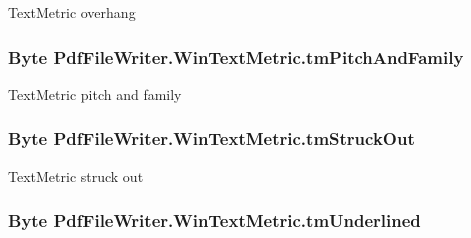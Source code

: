 Text\+Metric overhang 

\subsubsection[{\texorpdfstring{tm\+Pitch\+And\+Family}{tmPitchAndFamily}}]{\setlength{\rightskip}{0pt plus 5cm}Byte Pdf\+File\+Writer.\+Win\+Text\+Metric.\+tm\+Pitch\+And\+Family\hspace{0.3cm}{\ttfamily [get]}}\hypertarget{class_pdf_file_writer_1_1_win_text_metric_ad557d75a4c414b8531c2b94af735dd3f}{}\label{class_pdf_file_writer_1_1_win_text_metric_ad557d75a4c414b8531c2b94af735dd3f}


Text\+Metric pitch and family 

\subsubsection[{\texorpdfstring{tm\+Struck\+Out}{tmStruckOut}}]{\setlength{\rightskip}{0pt plus 5cm}Byte Pdf\+File\+Writer.\+Win\+Text\+Metric.\+tm\+Struck\+Out\hspace{0.3cm}{\ttfamily [get]}}\hypertarget{class_pdf_file_writer_1_1_win_text_metric_a97c902bffde99c2cec601f3a263bb1e0}{}\label{class_pdf_file_writer_1_1_win_text_metric_a97c902bffde99c2cec601f3a263bb1e0}


Text\+Metric struck out 

\subsubsection[{\texorpdfstring{tm\+Underlined}{tmUnderlined}}]{\setlength{\rightskip}{0pt plus 5cm}Byte Pdf\+File\+Writer.\+Win\+Text\+Metric.\+tm\+Underlined\hspace{0.3cm}{\ttfamily [get]}}\hypertarget{class_pdf_file_writer_1_1_win_text_metric_a9266ba36e75f53bc68cebee3dd82cda1}{}\label{class_pdf_file_writer_1_1_win_text_metric_a9266ba36e75f53bc68cebee3dd82cda1}


